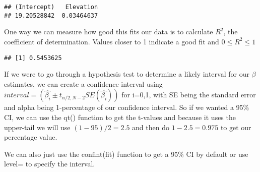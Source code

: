\documentclass[
]{article}
\newenvironment{Shaded}{\begin{snugshade}}{\end{snugshade}}
\newcommand{\AttributeTok}[1]{\textcolor[rgb]{0.13,0.29,0.53}{#1}}
\newcommand{\DecValTok}[1]{\textcolor[rgb]{0.00,0.00,0.81}{#1}}
\newcommand{\FloatTok}[1]{\textcolor[rgb]{0.00,0.00,0.81}{#1}}
\newcommand{\FunctionTok}[1]{\textcolor[rgb]{0.13,0.29,0.53}{\textbf{#1}}}
\newcommand{\NormalTok}[1]{#1}
\newcommand{\OtherTok}[1]{\textcolor[rgb]{0.56,0.35,0.01}{#1}}
\newcommand{\SpecialCharTok}[1]{\textcolor[rgb]{0.81,0.36,0.00}{\textbf{#1}}}
\begin{document}
\begin{verbatim}
## (Intercept)   Elevation 
## 19.20528842  0.03464637
\end{verbatim}

One way we can measure how good this fits our data is to calculate
\(R^2\), the coefficient of determination. Values closer to 1 indicate a
good fit and \(0 \leq R^2 \leq 1\)

\begin{Shaded}
\end{Shaded}

\begin{verbatim}
## [1] 0.5453625
\end{verbatim}

If we were to go through a hypothesis test to determine a likely
interval for our \(\beta\) estimates, we can create a confidence
interval using
\(interval=(\hat{\beta_i} \pm t_{\alpha/2,N-2}SE(\hat{\beta_i}))\) for
i=0,1, with SE being the standard error and alpha being 1-percentage of
our confidence interval. So if we wanted a 95\% CI, we can use the qt()
function to get the t-values and because it uses the upper-tail we will
use \((1-95)/2=2.5\) and then do \(1-2.5=0.975\) to get our percentage
value.

We can also just use the confint(fit) function to get a 95\% CI by
default or use level= to specify the interval.

\begin{Shaded}
\end{Shaded}
\end{document}
